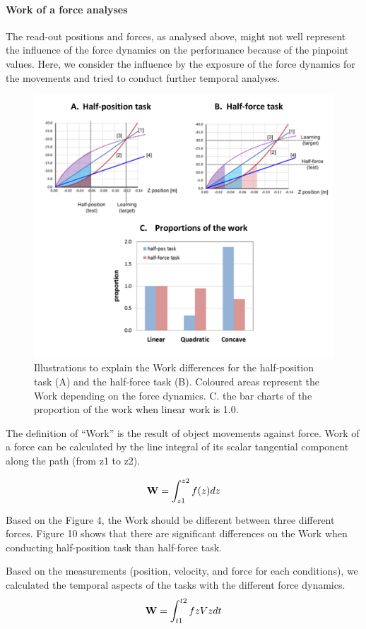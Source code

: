 \paragraph{Work of a force analyses}
The read-out positions and forces, as analysed above, might not well represent the influence of the force dynamics on the performance because of the pinpoint values. Here, we consider the influence by the exposure of the force dynamics for the movements and tried to conduct further temporal analyses.
%
\begin{figure}
	\centering
	\includegraphics[width=.7\textwidth]{Chie/figs/Figure10.png}
	\caption{Illustrations to explain the Work differences for the half-position task (A) and the half-force task (B). Coloured areas represent the Work depending on the force dynamics. C. the bar charts of the proportion of the work when linear work is 1.0. }
	\label{work}
\end{figure}
The definition of “Work” is the result of object movements against force. Work of a force can be calculated by the line integral of its scalar tangential component along the path (from z1 to z2).

%
\begin{equation}
\mathbf{W} = \int_{z1}^{z2} f(z) dz
\end{equation}
%

Based on the Figure 4, the Work should be different between three different forces.
Figure 10 shows that there are significant differences on the Work when conducting half-position task than half-force task.

Based on the measurements (position, velocity, and force for each conditions), we calculated the temporal aspects of the tasks with the different force dynamics.
%
\begin{equation}
\mathbf{W} = \int_{t1}^{t2} fz Vz dt
\end{equation}
%

